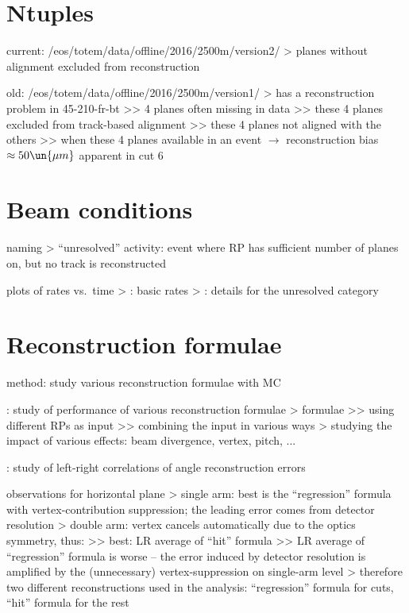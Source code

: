 \section{Ntuples}

\> current: /eos/totem/data/offline/2016/2500m/version2/
\>> planes without alignment excluded from reconstruction

\> old: /eos/totem/data/offline/2016/2500m/version1/
\>> has a reconstruction problem in 45-210-fr-bt
\>>> 4 planes often missing in data
\>>> these 4 planes excluded from track-based alignment
\>>> these 4 planes not aligned with the others
\>>> when these 4 planes available in an event $\rightarrow$ reconstruction bias $\approx 50\un{\mu m}$ apparent in cut 6



\section{Beam conditions}

\> naming
\>> ``unresolved'' activity: event where RP has sufficient number of planes on, but no track is reconstructed

\> plots of rates vs.~time
\>> : basic rates
\>> : details for the unresolved category



\section{Reconstruction formulae}

\> method: study various reconstruction formulae with MC

\>  : study of performance of various reconstruction formulae
\>> formulae
\>>> using different RPs as input
\>>> combining the input in various ways
\>> studying the impact of various effects: beam divergence, vertex, pitch, ...

\>  : study of left-right correlations of angle reconstruction errors

\> observations for horizontal plane
\>> single arm: best is the ``regression'' formula with vertex-contribution suppression; the leading error comes from detector resolution
\>> double arm: vertex cancels automatically due to the optics symmetry, thus:
\>>> best: LR average of ``hit'' formula
\>>> LR average of ``regression'' formula is worse -- the error induced by detector resolution is amplified by the (unnecessary) vertex-suppression on single-arm level
\>> therefore two different reconstructions used in the analysis: ``regression'' formula for cuts, ``hit'' formula for the rest

